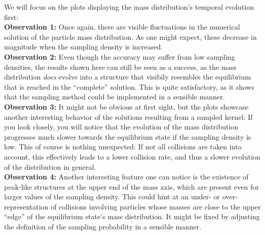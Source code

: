         We will focus on the plots displaying the mass distribution's temporal 
        evolution first: \\

        \textbf{Observation 1:} Once again, there are visible fluctuations in the numerical 
        solution of the particle mass distribution. As one might expect, these decrease in 
        magnitude when the sampling density is increased. \\

        \textbf{Observation 2:} Even though the accuracy may suffer from low sampling densities,
        the results shown here can still be seen as a success, as the mass distribution
        \textit{does} evolve into a structure that visibily resembles the equilibrium that is
        reached in the ``complete'' solution. This is quite satisfactory, as it shows that the 
        sampling method could be implemented in a sensible manner. \\

        \textbf{Observation 3:} It might not be obvious at first sight, but the plots showcase
        another interesting behavior of the solutions resulting from a sampled kernel: 
        If you look closely, you will notice that the evolution of the mass distribution 
        progresses much slower towards the equilibrium state if the sampling density is low. 
        This of course is nothing unexpected: If not all collisions are taken into account,
        this effectively leads to a lower collision rate, and thus a slower evolution 
        of the distribution in general. \\


        \textbf{Observation 4:} 
        Another interesting feature one can notice is the existence 
        of peak-like structures at the upper end of the mass axis, which are present even 
        for larger values of the sampling density.
        This could hint at an under- or over-representation of collisions involving particles 
        whose masses are close to the upper ``edge'' of the equilibrium state's mass distribution.
        It might be fixed by adjusting the definition of the sampling probability in a 
        sensible manner.
        \\
        
